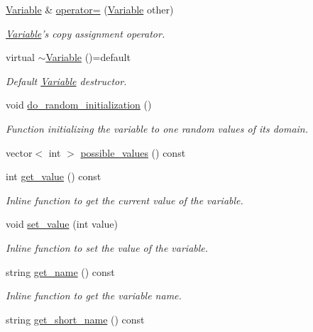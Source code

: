 \begin{DoxyCompactItemize}
\hyperlink{classghost_1_1Variable}{Variable} \& \hyperlink{classghost_1_1Variable_ad82b892892c3531cc3d54d6b5d048bf6}{operator=} (\hyperlink{classghost_1_1Variable}{Variable} other)
\begin{DoxyCompactList}\small\item\em \hyperlink{classghost_1_1Variable}{Variable}'s copy assignment operator. \end{DoxyCompactList}\item 
virtual \hyperlink{classghost_1_1Variable_a718686ab389bd31ae0f3cbb312c9be77}{$\sim$\-Variable} ()=default
\begin{DoxyCompactList}\small\item\em Default \hyperlink{classghost_1_1Variable}{Variable} destructor. \end{DoxyCompactList}\item 
void \hyperlink{classghost_1_1Variable_a37018e24ee21e12649599409d7ac3640}{do\-\_\-random\-\_\-initialization} ()
\begin{DoxyCompactList}\small\item\em Function initializing the variable to one random values of its domain. \end{DoxyCompactList}\item 
vector$<$ int $>$ \hyperlink{classghost_1_1Variable_ab303d5c4c3c79cc5015e1f9df9fd9b76}{possible\-\_\-values} () const 
\item 
int \hyperlink{classghost_1_1Variable_a7bdebf8b2a369f337690ac38ece31793}{get\-\_\-value} () const 
\begin{DoxyCompactList}\small\item\em Inline function to get the current value of the variable. \end{DoxyCompactList}\item 
void \hyperlink{classghost_1_1Variable_a06f6c296986a017e1713961b4d763b0c}{set\-\_\-value} (int value)
\begin{DoxyCompactList}\small\item\em Inline function to set the value of the variable. \end{DoxyCompactList}\item 
string \hyperlink{classghost_1_1Variable_a70c22841aa8d0ebe75eea92f1831c126}{get\-\_\-name} () const 
\begin{DoxyCompactList}\small\item\em Inline function to get the variable name. \end{DoxyCompactList}\item 
string \hyperlink{classghost_1_1Variable_a993e65196f2bcd0e5e5f4453736e36c5}{get\-\_\-short\-\_\-name} () const 

\end{DoxyCompactItemize}
